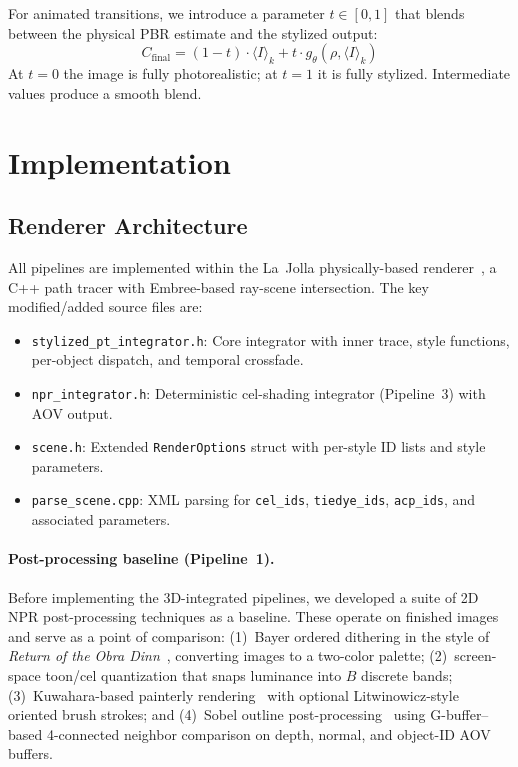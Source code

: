 \documentclass{article}
\begin{document}
For animated transitions, we introduce a parameter $t \in [0, 1]$ that blends between the physical PBR estimate and the stylized output:
\begin{equation}
    C_{\text{final}} = (1 - t) \cdot \langle I \rangle_k + t \cdot g_\theta(\rho, \langle I \rangle_k)
    \label{eq:crossfade}
\end{equation}
At $t = 0$ the image is fully photorealistic; at $t = 1$ it is fully stylized. Intermediate values produce a smooth blend.


\section{Implementation}
\label{sec:implementation}

\subsection{Renderer Architecture}

All pipelines are implemented within the La~Jolla physically-based renderer~\cite{li2018differentiable}, a C++ path tracer with Embree-based ray-scene intersection. The key modified/added source files are:

\begin{itemize}
    \item \texttt{stylized\_pt\_integrator.h}: Core integrator with inner trace, style functions, per-object dispatch, and temporal crossfade.
    \item \texttt{npr\_integrator.h}: Deterministic cel-shading integrator (Pipeline~3) with AOV output.
    \item \texttt{scene.h}: Extended \texttt{RenderOptions} struct with per-style ID lists and style parameters.
    \item \texttt{parse\_scene.cpp}: XML parsing for \texttt{cel\_ids}, \texttt{tiedye\_ids}, \texttt{acp\_ids}, and associated parameters.
\end{itemize}

\paragraph{Post-processing baseline (Pipeline~1).}
\label{sec:postproc}
Before implementing the 3D-integrated pipelines, we developed a suite of 2D NPR post-processing techniques as a baseline. These operate on finished images and serve as a point of comparison: (1)~Bayer ordered dithering in the style of \emph{Return of the Obra Dinn}~\cite{obradinn2018,floyd1976adaptive}, converting images to a two-color palette; (2)~screen-space toon/cel quantization that snaps luminance into $B$ discrete bands; (3)~Kuwahara-based painterly rendering~\cite{kuwahara1976processing} with optional Litwinowicz-style~\cite{litwinowicz1997processing} oriented brush strokes; and (4)~Sobel outline post-processing~\cite{saito1990comprehensible} using G-buffer--based 4-connected neighbor comparison on depth, normal, and object-ID AOV buffers.
\end{document}

